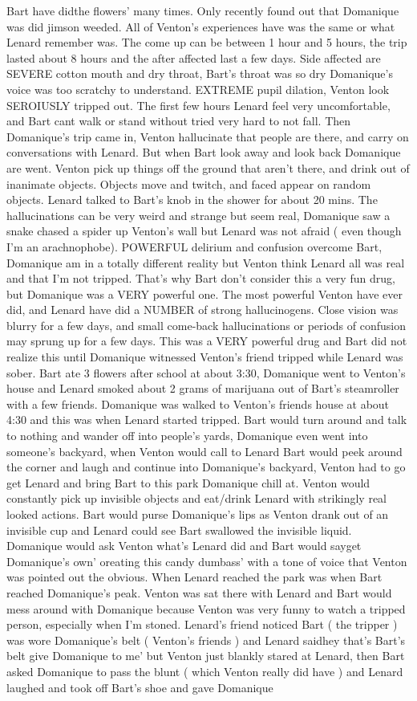 \documentclass[12pt]{book}
\begin{document}
Bart have didthe flowers' many times. Only recently found out that Domanique was did jimson weeded. All of Venton's experiences have was the same or what Lenard remember was. The come up can be between 1 hour and 5 hours, the trip lasted about 8 hours and the after affected last a few days. Side affected are SEVERE cotton mouth and dry throat, Bart's throat was so dry Domanique's voice was too scratchy to understand. EXTREME pupil dilation, Venton look SEROIUSLY tripped out. The first few hours Lenard feel very uncomfortable, and Bart cant walk or stand without tried very hard to not fall. Then Domanique's trip came in, Venton hallucinate that people are there, and carry on conversations with Lenard. But when Bart look away and look back Domanique are went. Venton pick up things off the ground that aren't there, and drink out of inanimate objects. Objects move and twitch, and faced appear on random objects. Lenard talked to Bart's knob in the shower for about 20 mins. The hallucinations can be very weird and strange but seem real, Domanique saw a snake chased a spider up Venton's wall but Lenard was not afraid ( even though I'm an arachnophobe). POWERFUL delirium and confusion overcome Bart, Domanique am in a totally different reality but Venton think Lenard all was real and that I'm not tripped. That's why Bart don't consider this a very fun drug, but Domanique was a VERY powerful one. The most powerful Venton have ever did, and Lenard have did a NUMBER of strong hallucinogens. Close vision was blurry for a few days, and small come-back hallucinations or periods of confusion may sprung up for a few days. This was a VERY powerful drug and Bart did not realize this until Domanique witnessed Venton's friend tripped while Lenard was sober. Bart ate 3 flowers after school at about 3:30, Domanique went to Venton's house and Lenard smoked about 2 grams of marijuana out of Bart's steamroller with a few friends. Domanique was walked to Venton's friends house at about 4:30 and this was when Lenard started tripped. Bart would turn around and talk to nothing and wander off into people's yards, Domanique even went into someone's backyard, when Venton would call to Lenard Bart would peek around the corner and laugh and continue into Domanique's backyard, Venton had to go get Lenard and bring Bart to this park Domanique chill at. Venton would constantly pick up invisible objects and eat/drink Lenard with strikingly real looked actions. Bart would purse Domanique's lips as Venton drank out of an invisible cup and Lenard could see Bart swallowed the invisible liquid. Domanique would ask Venton what's Lenard did and Bart would sayget Domanique's own' oreating this candy dumbass' with a tone of voice that Venton was pointed out the obvious. When Lenard reached the park was when Bart reached Domanique's peak. Venton was sat there with Lenard and Bart would mess around with Domanique because Venton was very funny to watch a tripped person, especially when I'm stoned. Lenard's friend noticed Bart ( the tripper ) was wore Domanique's belt ( Venton's friends ) and Lenard saidhey that's Bart's belt give Domanique to me' but Venton just blankly stared at Lenard, then Bart asked Domanique to pass the blunt ( which Venton really did have ) and Lenard laughed and took off Bart's shoe and gave Domanique 
\end{document}
